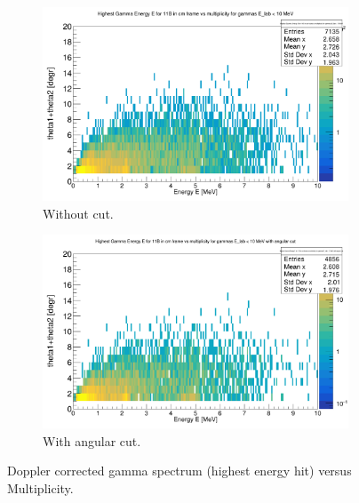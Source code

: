 \documentclass{report}
\begin{document}
\begin{figure}[ht]
\begin{subfigure}{.5\textwidth}
  \centering
  \includegraphics[width=\linewidth]{gamma_multiplicity.png}
  \caption{Without cut.}
  \label{fig:sub-first}
\end{subfigure}
\begin{subfigure}{.5\textwidth}
  \centering
  \includegraphics[width=\linewidth]{gamma_multiplicity_cut.png}
  \caption{With angular cut.}
  \label{fig:sub-second}
\end{subfigure}
\caption{Doppler corrected gamma spectrum (highest energy hit) versus Multiplicity.}
\label{fig:gamma_multiplicity_cut}
\end{figure}
\end{document}
